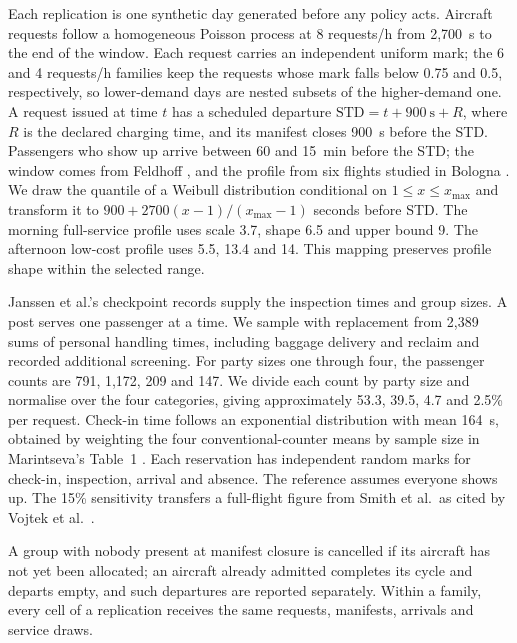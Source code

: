 \documentclass[12pt,a4paper]{article}
\makeatletter
\renewcommand\subsection{\@startsection{subsection}{2}{\z@}{8pt}{2pt}{\normalsize\bfseries}}
\makeatother
\begin{document}
Each replication is one synthetic day generated before any policy acts. Aircraft requests follow a
homogeneous Poisson process at 8 requests/h from 2,700~s to the end of the window. Each request
carries an independent uniform mark; the 6 and 4 requests/h families keep the requests whose mark
falls below 0.75 and 0.5, respectively, so lower-demand days are nested subsets of the higher-demand
one. A request issued at time $t$ has a scheduled departure $\mathrm{STD}=t+900~\text{s}+R$, where
$R$ is the declared charging time, and its manifest closes 900~s before the STD. Passengers who show
up arrive between 60 and 15~min before the STD; the window comes from Feldhoff \cite{feldhoff2022},
and the profile from six flights studied in Bologna \cite{postorino2019}. We draw the quantile of a Weibull distribution conditional on $1\le x\le x_{\max}$ and transform it to $900+2700(x-1)/(x_{\max}-1)$ seconds before STD. The morning full-service profile uses scale 3.7, shape 6.5 and upper bound 9. The afternoon low-cost profile uses 5.5, 13.4 and 14. This mapping preserves profile shape within the selected range.

Janssen et al.'s checkpoint records \cite{janssen2020security} supply the inspection times and group sizes. A post serves one passenger at a time. We sample with replacement from 2,389 sums of personal handling times, including baggage delivery and reclaim and recorded additional screening. For party sizes one through four, the passenger counts are 791, 1,172, 209 and 147. We divide each count by party size and normalise over the four categories, giving approximately 53.3, 39.5, 4.7 and 2.5\% per request. Check-in time follows an exponential distribution with mean 164~s, obtained by weighting the four conventional-counter means by sample size in Marintseva's Table~1 \cite{marintseva2014}. Each reservation has independent random marks for check-in, inspection, arrival and absence. The reference assumes everyone shows up. The 15\% sensitivity transfers a full-flight figure from Smith et al.\ as cited by Vojtek et al.\ \cite{vojtek2021}.

A group with nobody present at manifest closure is cancelled if its aircraft has
not yet been allocated; an aircraft already admitted completes its cycle and departs empty, and such
departures are reported separately. Within a family, every cell of a replication receives the same
requests, manifests, arrivals and service draws.

\subsection{Allocation policies}
\end{document}
